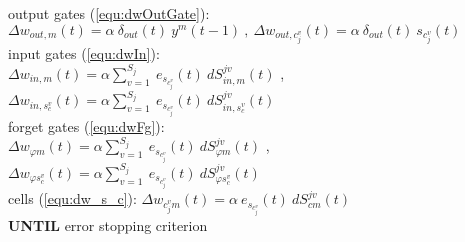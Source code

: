 {{\begin{tabbing}
  \>  \> output gates (\ref{equ:dwOutGate}):\\
  \>  \> $\Delta w_{out,m}(t) = \alpha \ \delta_{out}(t) \ y^m(t\!-\!1) \ , \ 
\Delta w_{out,c_j^v}(t) = \alpha \ \delta_{out}(t) \ s_{c_j^v}(t)$\\
  \>  \> input gates (\ref{equ:dwIn}): \\
  \>  \> $\Delta w_{in,m}(t) = \alpha \sum_{v=1}^{S_j} \ e_{s_{c_j^v}}(t) \ dS^{jv}_{in,m}(t)$ , 
$\Delta w_{in,s_c^v}(t) = \alpha \sum_{v=1}^{S_j} \ e_{s_{c_j^v}}(t) \ dS^{jv}_{in,s_c^v}(t)$\\
  \>  \> forget gates (\ref{equ:dwFg}): \\
  \>  \> $\Delta w_{\varphi m}(t) = \alpha  \sum_{v=1}^{S_j} \ e_{s_{c_j^v}}(t) \ dS^{jv}_{\varphi m}(t)$ ,
$\Delta w_{\varphi s_c^v}(t) = \alpha \sum_{v=1}^{S_j} \ e_{s_{c_j^v}}(t) \ dS^{jv}_{\varphi s_c^v}(t)$\\
  \>  \> cells (\ref{equ:dw_s_c}): $\Delta w_{c_j^vm}(t) = \alpha \ e_{s_{c_j^v}}(t) \ dS^{jv}_{c m}(t)$\\
{\bf UNTIL} error stopping criterion 
\end{tabbing}
}}